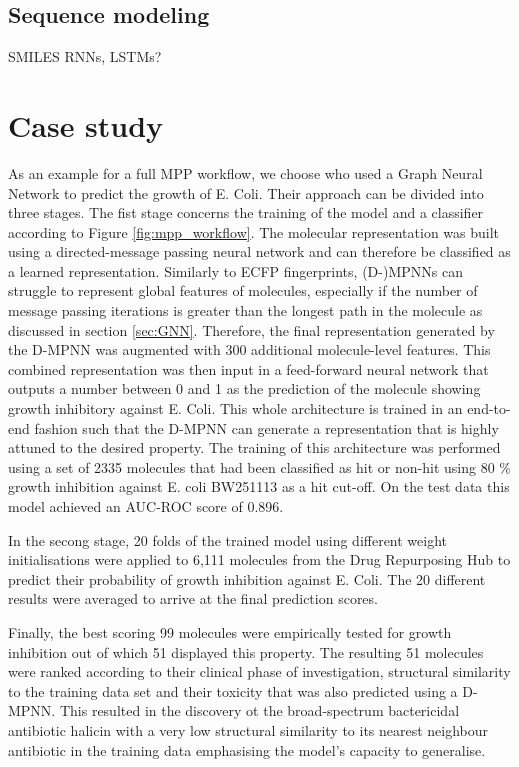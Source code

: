 \subsection{Sequence modeling}
SMILES RNNs, LSTMs? \cite{honda}
\section{Case study}


As an example for a full MPP workflow, we choose \cite{STOKES2020688} who used a Graph Neural Network to predict the growth of E. Coli. Their approach can be divided into three stages. The fist stage concerns the training of the model and a classifier according to Figure \ref{fig:mpp_workflow}. The molecular representation was built using a directed-message passing neural network \cite{yangMPP} and can therefore be classified as a learned representation. Similarly to ECFP fingerprints, (D-)MPNNs can struggle to represent global features of molecules, especially if the number of message passing iterations is greater than the longest path in the molecule as discussed in section \ref{sec:GNN}. Therefore, the final representation generated by the D-MPNN was augmented with 300 additional molecule-level features. This combined representation was then input in a feed-forward neural network that outputs a number between 0 and 1 as the prediction of the molecule showing growth inhibitory against E. Coli. This whole architecture is trained in an end-to-end fashion such that the D-MPNN can generate a representation that is highly attuned to the desired property.
The training of this architecture was performed using a set of 2335 molecules that had been classified as hit or non-hit using 80 \% growth inhibition against E. coli BW251113 \cite{ZAMPIERI20171214} as a hit cut-off. On the test data this model achieved an AUC-ROC score of 0.896.

In the secong stage, 20 folds of the trained model using different weight initialisations were applied to 6,111 molecules from the Drug Repurposing Hub \citep{corsello} to predict their probability of growth inhibition against E. Coli. The 20 different results were averaged to arrive at the final prediction scores. 

Finally, the best scoring 99 molecules were empirically tested for growth inhibition out of which 51 displayed this property. The resulting 51 molecules were ranked according to their clinical phase of investigation, structural similarity to the training data set and their toxicity that was also predicted using a D-MPNN. This resulted in the discovery ot the broad-spectrum bactericidal antibiotic halicin with a very low structural similarity to its nearest neighbour antibiotic in the training data emphasising the model's capacity to generalise. 

